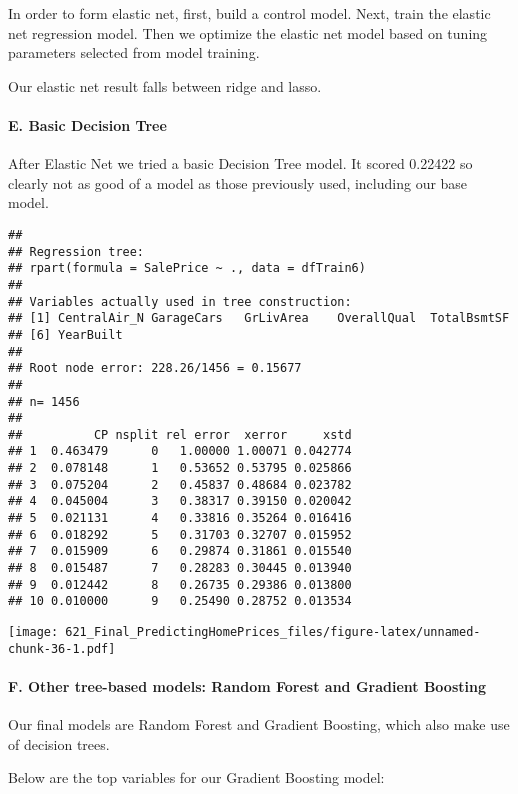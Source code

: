 \documentclass[
]{article}
\begin{document}
In order to form elastic net, first, build a control model. Next, train
the elastic net regression model. Then we optimize the elastic net model
based on tuning parameters selected from model training.

Our elastic net result falls between ridge and lasso.

\hypertarget{e.-basic-decision-tree}{%
\paragraph{E. Basic Decision Tree}\label{e.-basic-decision-tree}}

After Elastic Net we tried a basic Decision Tree model. It scored
0.22422 so clearly not as good of a model as those previously used,
including our base model.

\begin{verbatim}
## 
## Regression tree:
## rpart(formula = SalePrice ~ ., data = dfTrain6)
## 
## Variables actually used in tree construction:
## [1] CentralAir_N GarageCars   GrLivArea    OverallQual  TotalBsmtSF 
## [6] YearBuilt   
## 
## Root node error: 228.26/1456 = 0.15677
## 
## n= 1456 
## 
##          CP nsplit rel error  xerror     xstd
## 1  0.463479      0   1.00000 1.00071 0.042774
## 2  0.078148      1   0.53652 0.53795 0.025866
## 3  0.075204      2   0.45837 0.48684 0.023782
## 4  0.045004      3   0.38317 0.39150 0.020042
## 5  0.021131      4   0.33816 0.35264 0.016416
## 6  0.018292      5   0.31703 0.32707 0.015952
## 7  0.015909      6   0.29874 0.31861 0.015540
## 8  0.015487      7   0.28283 0.30445 0.013940
## 9  0.012442      8   0.26735 0.29386 0.013800
## 10 0.010000      9   0.25490 0.28752 0.013534
\end{verbatim}

\texttt{[image: 621\_Final\_PredictingHomePrices\_files/figure-latex/unnamed-chunk-36-1.pdf]}

\hypertarget{f.-other-tree-based-models-random-forest-and-gradient-boosting}{%
\paragraph{F. Other tree-based models: Random Forest and Gradient
Boosting}\label{f.-other-tree-based-models-random-forest-and-gradient-boosting}}

Our final models are Random Forest and Gradient Boosting, which also
make use of decision trees.

Below are the top variables for our Gradient Boosting model:
\end{document}
